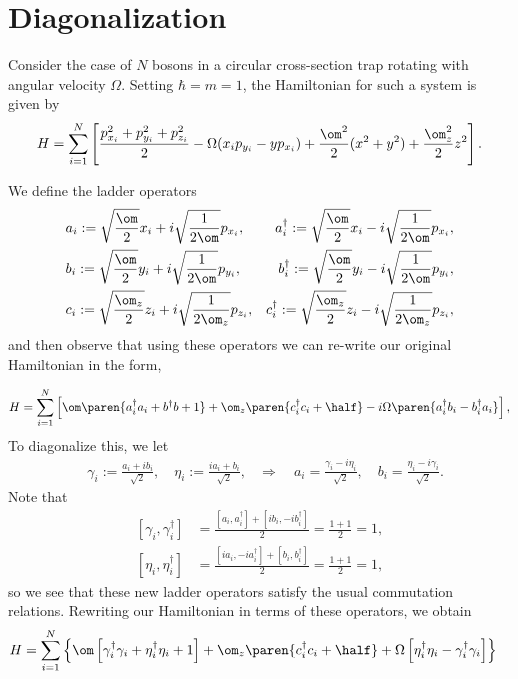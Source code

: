 \documentclass{article}
\begin{document}
\section{Diagonalization}

Consider the case of $N$ bosons in a circular cross-section trap rotating with angular velocity $\Omega$.  Setting $\hbar=m=1$, the Hamiltonian for such a system is given by
$$H = \sum_{i=1}^N \left[\frac{p_{x_i}^2 + p_{y_i}^2 + p_{z_i}^2}{2} - \Omega(x_i
  p_{y_i} - y p_{x_i}) + \frac{\om^2}{2}(x^2+y^2) + \frac{\om_z^2}{2}z^2\right].$$

We define the ladder operators
$$
\begin{aligned}
&a_i:= \sqrt{\frac{\om}{2}}x_i + i\sqrt{\frac{1}{2\om}}p_{x_i},
&a_i^\dagger := \sqrt{\frac{\om}{2}}x_i - i\sqrt{\frac{1}{2\om}}p_{x_i},\\
&b_i:= \sqrt{\frac{\om}{2}}y_i + i\sqrt{\frac{1}{2\om}}p_{y_i},
&b_i^\dagger := \sqrt{\frac{\om}{2}}y_i - i\sqrt{\frac{1}{2\om}}p_{y_i} ,\\
&c_i:= \sqrt{\frac{\om_z}{2}}z_i + i\sqrt{\frac{1}{2\om_z}}p_{z_i},
&c_i^\dagger := \sqrt{\frac{\om_z}{2}}z_i - i\sqrt{\frac{1}{2\om_z}}p_{z_i} ,\\
\end{aligned}
$$
and then observe that using these operators we can re-write our
original Hamiltonian in the form,

$$
\begin{aligned}
H
&= \sum_{i=1}^N \left[\om\paren{a_i^\dagger a_i + b^\dagger b + 1} +  \om_z\paren{c_i^\dagger c_i + \half} - i\Omega\paren{a_i^\dagger b_i - b_i^\dagger a_i}\right],\\
\end{aligned}
$$
To diagonalize this, we let
$$
\begin{aligned}
&\gamma_i := \frac{a_i + i b_i}{\sqrt{2}}, \quad \eta_i := \frac{i a_i + b_i}{\sqrt{2}},
&\Rightarrow\quad a_i = \frac{\gamma_i - i \eta_i}{\sqrt 2}, \quad b_i =\frac{\eta_i - i \gamma_i}{\sqrt 2}.
\end{aligned}
$$
Note that
$$
\begin{aligned}
\left[\gamma_i,\gamma_i^\dagger\right] &=
  \frac{\left[a_i,a_i^\dagger\right] +
  \left[ib_i,-ib_i^\dagger\right]}{2} = \frac{1+1}{2} = 1,\\
\left[\eta_i,\eta_i^\dagger\right] &=
  \frac{\left[i a_i,-i a_i^\dagger\right] +
  \left[b_i,b_i^\dagger\right]}{2} = \frac{1+1}{2} = 1,
\end{aligned}
$$
so we see that these new ladder operators satisfy the usual
commutation relations.  Rewriting our Hamiltonian in terms of these
operators, we obtain
$$
\begin{aligned}
H
&=  \sum_{i=1}^N \left\{\om\left[\gamma_i^\dagger\gamma_i + \eta_i^\dagger\eta_i + 1\right] + \om_z\paren{c_i^\dagger c_i + \half}+ \Omega\left[\eta_i^\dagger\eta_i - \gamma_i^\dagger\gamma_i\right]\right\}
\end{aligned}
$$
\end{document}

